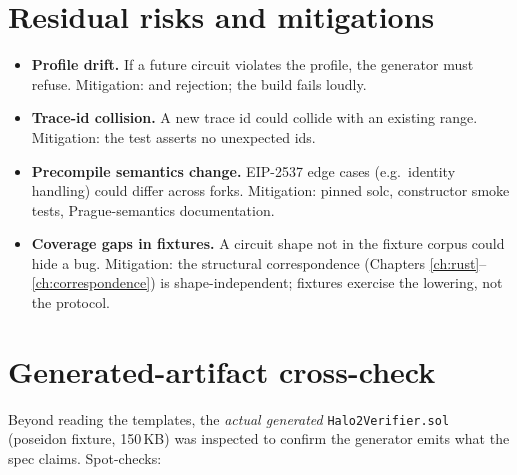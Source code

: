 \section{Residual risks and mitigations}
\label{sec:residual}

\begin{itemize}[leftmargin=1.4em,itemsep=2pt]
  \item \textbf{Profile drift.} If a future circuit violates the profile,
        the generator must refuse. Mitigation: 
        and  rejection; the build fails loudly.
  \item \textbf{Trace-id collision.} A new trace id could collide with an
        existing range. Mitigation: the test asserts no unexpected ids.
  \item \textbf{Precompile semantics change.} EIP-2537 edge cases (e.g.\
        identity handling) could differ across forks. Mitigation: pinned
        solc, constructor smoke tests, Prague-semantics documentation.
  \item \textbf{Coverage gaps in fixtures.} A circuit shape not in the
        fixture corpus could hide a bug. Mitigation: the structural
        correspondence (Chapters \ref{ch:rust}--\ref{ch:correspondence})
        is shape-independent; fixtures exercise the lowering, not the
        protocol.
\end{itemize}

\section{Generated-artifact cross-check}
\label{sec:artifact-crosscheck}

Beyond reading the templates, the \emph{actual generated}
\texttt{Halo2Verifier.sol} (poseidon fixture, 150\,KB) was inspected to
confirm the generator emits what the spec claims. Spot-checks:

